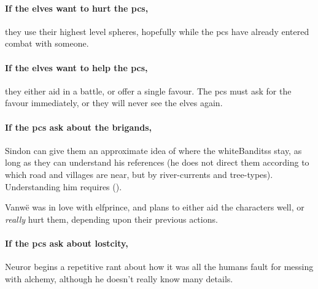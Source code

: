 \paragraph{If the elves want to hurt the \glspl{pc},}
they use their highest level spheres, hopefully while the \glspl{pc} have already entered combat with someone.

\paragraph{If the elves want to help the \glspl{pc},}
they either aid in a battle, or offer a single favour.
The \glspl{pc} must ask for the favour immediately, or they will never see the elves again.


\paragraph{If the \glspl{pc} ask about the brigands,}
Sindon can give them an approximate idea of where the \glspl{whiteBandits} stay, as long as they can understand his references (he does not direct them according to which road and \glspl{village} are near, but by river-currents and tree-types).
Understanding him requires  (\tn[10]).


Vanw\"e was in love with \gls{elfprince}, and plans to either aid the characters well, or \emph{really} hurt them, depending upon their previous actions.

\label{neuror}

\paragraph{If the \glspl{pc} ask about \gls{lostcity},}
Neuror begins a repetitive rant about how it was all the humans fault for messing with alchemy, although he doesn't really know many details.

